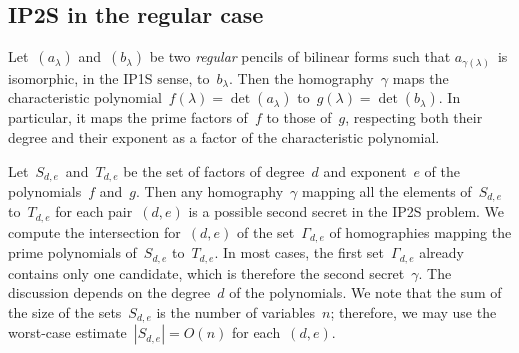 \documentclass{lms}%
\def\abs#1{\left|#1\right|}
\def\mat#1{\begin{pmatrix}#1\end{pmatrix}}
\def\smat{\def\arraystretch{.66}\mat}
\def\card#1{\abs{#1}}
\DeclareMathOperator\GL{GL}
\begin{document}
% 
% 


\subsection{IP2S in the regular case}

Let~$(a_{λ})$ and~$(b_{λ})$ be two \emph{regular} pencils of bilinear
forms such that $a_{γ(λ)}$~is isomorphic, in the IP1S sense, to~$b_{λ}$.
Then the homography~$γ$ maps the characteristic polynomial~$f(λ)
= \det (a_{λ})$ to~$g(λ) = \det (b_{λ})$. In particular, it maps the
prime factors of~$f$ to those of~$g$, respecting both their degree and
their exponent as a factor of the characteristic polynomial.

Let~$S_{d,e}$~and~$T_{d,e}$ be the set of factors of degree~$d$ and
exponent~$e$ of the polynomials~$f$ and~$g$. Then any homography~$γ$
mapping all the elements of~$S_{d,e}$ to~$T_{d,e}$ for each pair~$(d,e)$
is a possible second secret in the IP2S problem. We compute the
intersection for~$(d,e)$ of the set~$Γ_{d,e}$ of homographies mapping the
prime polynomials of~$S_{d,e}$ to~$T_{d,e}$. In most cases, the first
set~$Γ_{d,e}$ already contains only one candidate, which is therefore the
second secret~$γ$. The discussion depends on the degree~$d$ of the
polynomials. We note that the sum of the size of the sets~$S_{d,e}$ is
the number of variables~$n$; therefore, we may use the worst-case
estimate~$\card{S_{d,e}} = O(n)$ for each~$(d,e)$.
\end{document}
